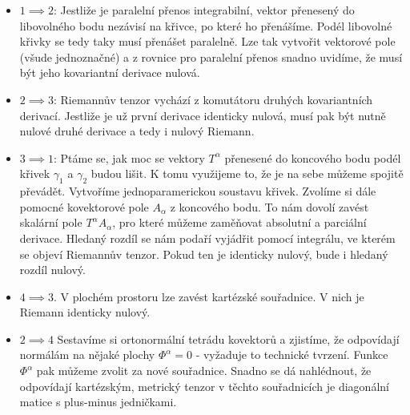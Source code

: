 \documentclass{article}
\begin{document}
\begin{itemize}
    \item $1 \implies 2$: Jestliže je paralelní přenos integrabilní, vektor přenesený do libovolného bodu nezávisí na křivce, po které ho přenášíme. Podél libovolné křivky se tedy taky musí přenášet paralelně. Lze tak vytvořit vektorové pole (všude jednoznačné) a z rovnice pro paralelní přenos snadno uvidíme, že musí být jeho kovariantní derivace nulová.
    \item $2 \implies 3$: Riemannův tenzor vychází z komutátoru druhých kovariantních derivací. Jestliže je už první derivace identicky nulová, musí pak být nutně nulové druhé derivace a tedy i nulový Riemann.
    \item $3 \implies 1$: Ptáme se, jak moc se vektory $T^\alpha$ přenesené do koncového bodu podél křivek $\gamma_1$ a $\gamma_2$ budou lišit. K tomu využijeme to, že je na sebe můžeme spojitě převádět. Vytvoříme jednoparamerickou soustavu křivek. Zvolíme si dále pomocné kovektorové pole $A_\alpha$ z koncového bodu. To nám dovolí zavést skalární pole $T^\alpha A_\alpha$, pro které můžeme zaměňovat absolutní a parciální derivace. Hledaný rozdíl se nám podaří vyjádřit pomocí integrálu, ve kterém se objeví Riemannův tenzor. Pokud ten je identicky nulový, bude i hledaný rozdíl nulový.
    \item $4 \implies 3$. V plochém prostoru lze zavést kartézské souřadnice. V nich je Riemann identicky nulový.
    \item $2 \implies 4$ Sestavíme si ortonormální tetrádu kovektorů a zjistíme, že odpovídají normálám na nějaké plochy $\Phi^\alpha = 0$ - vyžaduje to technické tvrzení. Funkce $\Phi^\alpha$ pak můžeme zvolit za nové souřadnice. Snadno se dá nahlédnout, že odpovídají kartézským, metrický tenzor v těchto souřadnicích je diagonální matice s plus-minus jedničkami.

\end{itemize}

\newpage
\end{document}
